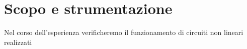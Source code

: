 \section{Scopo e strumentazione}

Nel corso dell'esperienza verificheremo il funzionamento di circuiti non lineari realizzati
